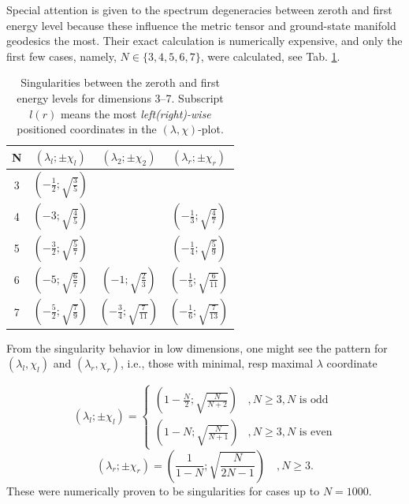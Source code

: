 Special attention is given to the spectrum degeneracies between zeroth and first energy level because these influence the metric tensor and ground-state manifold geodesics the most. Their exact calculation is numerically expensive, and only the first few cases, namely, $N\in\{3,4,5,6,7\}$, were calculated, see Tab. \ref{tab:singularities}. 
\begin{table}[h]
    \centering
    \vspace{-3pt}\begin{tabular}{c||c|c|c}
     N&$(\lambda_l;\pm\chi_l)$&$(\lambda_2;\pm\chi_2)$&$(\lambda_r;\pm\chi_r)$        \\ \hline\hline
     3&$(-\frac{1}{2};\sqrt{\frac{3}{5}}) $&                                       &                                         \\
     4&$(-3          ;\sqrt{\frac{4}{5}}) $&                                       & $(-\frac{1}{3};\sqrt{\frac{4}{7}})$     \\
     5&$(-\frac{3}{2};\sqrt{\frac{5}{7}}) $&                                       & $(-\frac{1}{4};\sqrt{\frac{5}{9}})$     \\
     6&$(-5          ;\sqrt{\frac{6}{7}}) $&$(-1          ;\sqrt{\frac{2}{3}}) $   & $(-\frac{1}{5};\sqrt{\frac{6}{11}})$     \\
     7&$(-\frac{5}{2};\sqrt{\frac{7}{9}}) $&$(-\frac{3}{4};\sqrt{\frac{7}{11}}) $  & $(-\frac{1}{6};\sqrt{\frac{7}{13}})$ 
    \end{tabular}
    \caption{Singularities between the zeroth and first energy levels for dimensions 3--7. Subscript $l(r)$ means the most \emph{left(right)-wise} positioned coordinates in the $(\lambda,\chi)$-plot.}
    \label{tab:singularities}
    \end{table} 

From the singularity behavior in low dimensions, one might see the pattern for $(\lambda_l,\chi_l)$ and $(\lambda_r,\chi_r)$, i.e., those with minimal, resp maximal $\lambda$ coordinate

\begin{equation}
    (\lambda_l ;\pm\chi_l)= \begin{cases}
        \left(1-\frac{N}{2};\sqrt{\frac{N}{N+2}}\right) & , N\geq 3,N\text{ is odd}\\
        \left(1-N;\sqrt{\frac{N}{N+1}}\right) & , N\geq 3,N\text{ is even}
    \end{cases}
    \label{eq:singularityCoordinateFormulaLeft}
\end{equation}
\begin{equation}
    (\lambda_r ;\pm\chi_r)= 
        \left(\frac{1}{1-N};\sqrt{\frac{N}{2N-1}}\right)\quad , N\geq 3.
        \label{eq:singularityCoordinateFormulaRight}
\end{equation}
These were numerically proven to be singularities for cases up to $N=1000$. 

